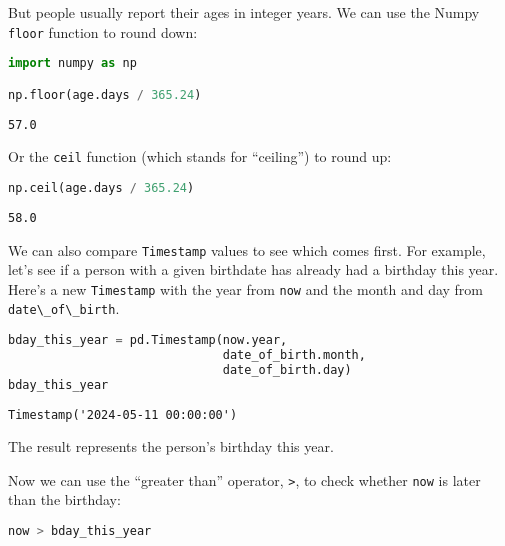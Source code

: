 But people usually report their ages in integer years. We can use the
Numpy \passthrough{\lstinline!floor!} function to round down:

\begin{lstlisting}[language=Python,style=source]
import numpy as np

np.floor(age.days / 365.24)
\end{lstlisting}

\begin{lstlisting}[style=output]
57.0
\end{lstlisting}

Or the \passthrough{\lstinline!ceil!} function (which stands for
``ceiling'') to round up:

\begin{lstlisting}[language=Python,style=source]
np.ceil(age.days / 365.24)
\end{lstlisting}

\begin{lstlisting}[style=output]
58.0
\end{lstlisting}

We can also compare \passthrough{\lstinline!Timestamp!} values to see
which comes first. For example, let's see if a person with a given
birthdate has already had a birthday this year. Here's a new
\passthrough{\lstinline!Timestamp!} with the year from
\passthrough{\lstinline!now!} and the month and day from
\passthrough{\lstinline!date\_of\_birth!}.

\begin{lstlisting}[language=Python,style=source]
bday_this_year = pd.Timestamp(now.year,
                              date_of_birth.month,
                              date_of_birth.day)
bday_this_year
\end{lstlisting}

\begin{lstlisting}[style=output]
Timestamp('2024-05-11 00:00:00')
\end{lstlisting}

The result represents the person's birthday this year.

\pagebreak

Now we can use
the ``greater than'' operator, \passthrough{\lstinline!>!}, to check
whether \passthrough{\lstinline!now!} is later than the birthday:

\begin{lstlisting}[language=Python,style=source]
now > bday_this_year
\end{lstlisting}

